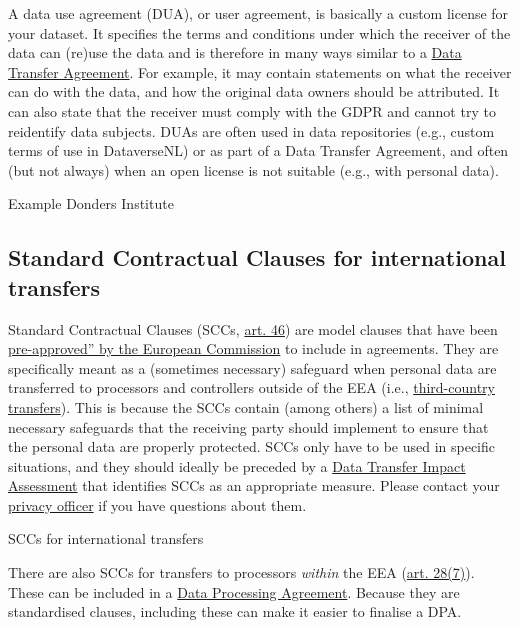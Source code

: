 \documentclass[
]{book}
\begin{document}
A data use agreement (DUA), or user agreement, is basically a custom license for
your dataset. It specifies the terms and conditions under which the receiver of
the data can (re)use the data and is therefore in many ways similar to a
\protect\hyperlink{data-transfer-agreement}{Data Transfer Agreement}. For example,
it may contain statements on what the receiver can do with the data, and how
the original data owners should be attributed. It can also state that the
receiver must comply with the GDPR and cannot try to reidentify data subjects.
DUAs are often used in data repositories (e.g., custom terms of use in
DataverseNL) or as part of a Data Transfer Agreement, and often (but not always)
when an open license is not suitable (e.g., with personal data).

Example Donders Institute

\hypertarget{scc}{%
\subsection{Standard Contractual Clauses for international transfers}\label{scc}}

Standard Contractual Clauses (SCCs,
\href{https://gdpr-info.eu/art-46-gdpr/}{art. 46}) are
model clauses that have been
\href{https://ec.europa.eu/info/law/law-topic/data-protection/international-dimension-data-protection/standard-contractual-clauses-scc_en}{pre-approved'' by the European Commission}
to include in agreements. They are specifically meant as a (sometimes necessary)
safeguard when personal data are transferred to processors and controllers
outside of the EEA (i.e., \protect\hyperlink{third-country-transfer}{third-country transfers}).
This is because the SCCs contain (among others) a list of
minimal necessary safeguards that the receiving party should implement to ensure
that the personal data are properly protected. SCCs only have to be used in
specific situations, and they should ideally be preceded by a
\protect\hyperlink{dia}{Data Transfer Impact Assessment} that identifies SCCs as an
appropriate measure. Please contact your \protect\hyperlink{support}{privacy officer}
if you have questions about them.

SCCs for international transfers

There are also SCCs for transfers to processors \emph{within} the EEA
(\href{https://gdpr-info.eu/art-28-gdpr/}{art. 28(7)}).
These can be included in a
\protect\hyperlink{data-processing-agreement}{Data Processing Agreement}. Because they
are standardised clauses, including these can make it easier to finalise a DPA.
\end{document}
